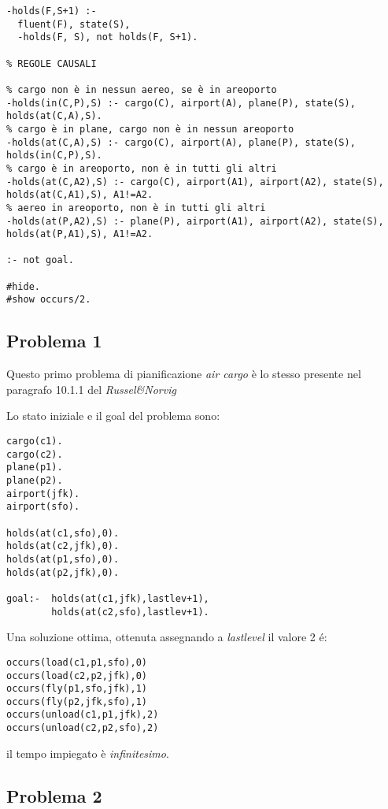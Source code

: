 \begin{lstlisting}
-holds(F,S+1) :-
  fluent(F), state(S),
  -holds(F, S), not holds(F, S+1).

% REGOLE CAUSALI

% cargo non è in nessun aereo, se è in areoporto
-holds(in(C,P),S) :- cargo(C), airport(A), plane(P), state(S), holds(at(C,A),S).
% cargo è in plane, cargo non è in nessun areoporto
-holds(at(C,A),S) :- cargo(C), airport(A), plane(P), state(S), holds(in(C,P),S).
% cargo è in areoporto, non è in tutti gli altri
-holds(at(C,A2),S) :- cargo(C), airport(A1), airport(A2), state(S), holds(at(C,A1),S), A1!=A2.
% aereo in areoporto, non è in tutti gli altri
-holds(at(P,A2),S) :- plane(P), airport(A1), airport(A2), state(S), holds(at(P,A1),S), A1!=A2.

:- not goal.

#hide.
#show occurs/2.
\end{lstlisting}

\subsection{Problema 1}

Questo primo problema di pianificazione \emph{air cargo} è lo stesso presente nel paragrafo 10.1.1 del \emph{Russel\&Norvig}

Lo stato iniziale e il goal del problema sono:

\begin{lstlisting}
cargo(c1).
cargo(c2).
plane(p1).
plane(p2).
airport(jfk).
airport(sfo).

holds(at(c1,sfo),0).
holds(at(c2,jfk),0).
holds(at(p1,sfo),0).
holds(at(p2,jfk),0).

goal:-  holds(at(c1,jfk),lastlev+1),
        holds(at(c2,sfo),lastlev+1).

\end{lstlisting}

Una soluzione ottima, ottenuta assegnando a \emph{lastlevel} il valore 2 é:

\begin{lstlisting}
occurs(load(c1,p1,sfo),0)
occurs(load(c2,p2,jfk),0)
occurs(fly(p1,sfo,jfk),1)
occurs(fly(p2,jfk,sfo),1)
occurs(unload(c1,p1,jfk),2)
occurs(unload(c2,p2,sfo),2)
\end{lstlisting}

il tempo impiegato è \emph{infinitesimo}.

\subsection{Problema 2}

